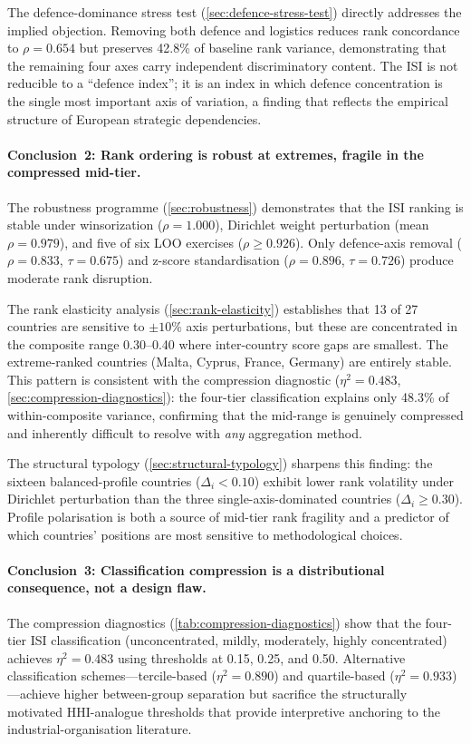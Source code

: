 The defence-dominance stress test (\cref{sec:defence-stress-test})
directly addresses the implied objection.  Removing both defence and
logistics reduces rank concordance to $\rho = 0.654$ but preserves
42.8\% of baseline rank variance, demonstrating that the remaining
four axes carry independent discriminatory content.  The ISI is not
reducible to a ``defence index''; it is an index in which defence
concentration is the single most important axis of variation, a
finding that reflects the empirical structure of European strategic
dependencies.

\paragraph{Conclusion~2: Rank ordering is robust at extremes, fragile
in the compressed mid-tier.}
The robustness programme (\cref{sec:robustness}) demonstrates that
the ISI ranking is stable under winsorization ($\rho = 1.000$),
Dirichlet weight perturbation (mean $\rho = 0.979$), and five of
six LOO exercises ($\rho \geq 0.926$).  Only defence-axis removal
($\rho = 0.833$, $\tau = 0.675$) and z-score standardisation
($\rho = 0.896$, $\tau = 0.726$) produce moderate rank disruption.

The rank elasticity analysis (\cref{sec:rank-elasticity}) establishes that
13 of 27 countries are sensitive to $\pm 10\%$ axis perturbations, but
these are concentrated in the composite range 0.30--0.40 where
inter-country score gaps are smallest.  The extreme-ranked countries
(Malta, Cyprus, France, Germany) are entirely stable.  This pattern
is consistent with the compression diagnostic ($\eta^2 = 0.483$,
\cref{sec:compression-diagnostics}): the four-tier classification
explains only 48.3\% of within-composite variance, confirming that
the mid-range is genuinely compressed and inherently difficult to
resolve with \emph{any} aggregation method.

The structural typology (\cref{sec:structural-typology}) sharpens
this finding: the sixteen balanced-profile countries ($\Delta_i < 0.10$)
exhibit lower rank volatility under Dirichlet perturbation than the
three single-axis-dominated countries ($\Delta_i \geq 0.30$).
Profile polarisation is both a source of mid-tier rank fragility and
a predictor of which countries' positions are most sensitive to
methodological choices.

\paragraph{Conclusion~3: Classification compression is a distributional
consequence, not a design flaw.}
The compression diagnostics (\cref{tab:compression-diagnostics}) show
that the four-tier ISI classification (unconcentrated, mildly,
moderately, highly concentrated) achieves $\eta^2 = 0.483$ using
thresholds at 0.15, 0.25, and 0.50.  Alternative classification
schemes---tercile-based
($\eta^2 = 0.890$) and quartile-based ($\eta^2 = 0.933$)---achieve
higher between-group separation but sacrifice the structurally
motivated HHI-analogue thresholds that provide interpretive anchoring
to the industrial-organisation literature.

